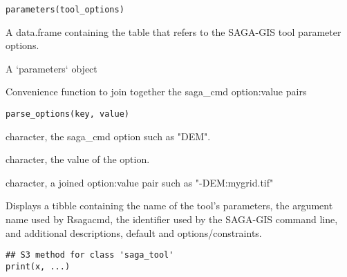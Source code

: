 \documentclass[a4paper]{book}
\begin{document}
%
\begin{Usage}
\begin{verbatim}
parameters(tool_options)
\end{verbatim}
\end{Usage}
%
\begin{Arguments}
\begin{ldescription}
\item[\code{tool\_options}] A data.frame containing the table that refers to the
SAGA-GIS tool parameter options.
\end{ldescription}
\end{Arguments}
%
\begin{Value}
A `parameters` object
\end{Value}
%
\begin{Description}
Convenience function to join together the saga\_cmd option:value pairs
\end{Description}
%
\begin{Usage}
\begin{verbatim}
parse_options(key, value)
\end{verbatim}
\end{Usage}
%
\begin{Arguments}
\begin{ldescription}
\item[\code{key}] character, the saga\_cmd option such as "DEM".

\item[\code{value}] character, the value of the option.
\end{ldescription}
\end{Arguments}
%
\begin{Value}
character, a joined option:value pair such as "-DEM:mygrid.tif"
\end{Value}
%
\begin{Description}
Displays a tibble containing the name of the tool's parameters, the argument
name used by Rsagacmd, the identifier used by the SAGA-GIS command line, and
additional descriptions, default and options/constraints.
\end{Description}
%
\begin{Usage}
\begin{verbatim}
## S3 method for class 'saga_tool'
print(x, ...)
\end{verbatim}
\end{Usage}
\end{document}
